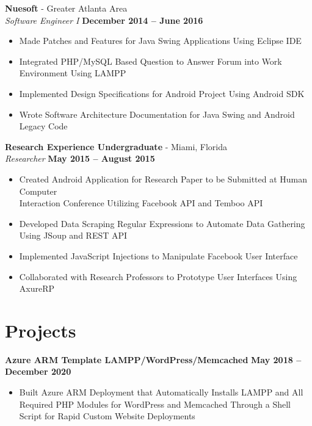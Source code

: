 \documentclass[margin,line]{resume}
\begin{document}
\begin{resume}
	\textbf{Nuesoft} - Greater Atlanta Area \vspace{1mm}\\\vspace{1mm}%
	\textsl{Software Engineer I} \hfill \textbf{December 2014 -- June 2016}
	\begin{itemize}
	 	\item Made Patches and Features for Java Swing Applications Using Eclipse IDE 
	 	\item Integrated PHP/MySQL Based Question to Answer Forum into Work Environment Using LAMPP
	 	\item Implemented Design Specifications for Android Project Using Android SDK
	 	\item Wrote Software Architecture Documentation for Java Swing and Android Legacy Code 
	\end{itemize}

	\textbf{Research Experience Undergraduate} - Miami, Florida \vspace{1mm}\\\vspace{1mm}%
	\textsl{Researcher} \hfill \textbf{May 2015 -- August 2015}
	\begin{itemize}
		\item Created Android Application for Research Paper to be Submitted at Human Computer\\
		Interaction Conference Utilizing Facebook API and Temboo API
		\item Developed Data Scraping Regular Expressions to Automate Data Gathering Using JSoup and REST API
		\item Implemented JavaScript Injections to Manipulate Facebook User Interface
		\item Collaborated with Research Professors to Prototype User Interfaces Using AxureRP
	\end{itemize}
	
	\section{\mysidestyle Projects}
	
	\textbf{Azure ARM Template LAMPP/WordPress/Memcached}  \hfill \textbf{May 2018 -- December 2020}
	\vspace{1mm}
	\begin{itemize}
		\item Built Azure ARM Deployment that Automatically Installs LAMPP and All Required PHP Modules for WordPress and Memcached Through a Shell Script for Rapid Custom Website Deployments
	\end{itemize}
	

\end{resume}
\end{document}
